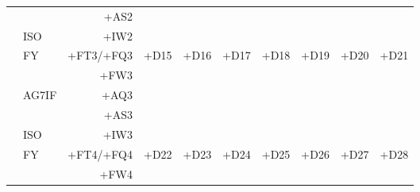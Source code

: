 \begin{center}
{\begin{tabular}{|c|lr|c|c|c|c|c|c|c|}
                        &       &      +AS2 &                            &                            &                            &                            &                            &                            &                            \\
                        & ISO   &      +IW2 &                            &                            &                            &                            &                            &                            &                            \\
\hline
    \multirow{5}{0.5in}{} & FY    & +FT3/+FQ3 & \multirow[t]{5}{1in}{+D15} & \multirow[t]{5}{1in}{+D16} & \multirow[t]{5}{1in}{+D17} & \multirow[t]{5}{1in}{+D18} & \multirow[t]{5}{1in}{+D19} & \multirow[t]{5}{1in}{+D20} & \multirow[t]{5}{1in}{+D21} \\
                        &       &      +FW3 &                            &                            &                            &                            &                            &                            &                            \\
                        & AG7IF &      +AQ3 &                            &                            &                            &                            &                            &                            &                            \\
                        &       &      +AS3 &                            &                            &                            &                            &                            &                            &                            \\
                        & ISO   &      +IW3 &                            &                            &                            &                            &                            &                            &                            \\
\hline
    \multirow{5}{0.5in}{} & FY    & +FT4/+FQ4 & \multirow[t]{5}{1in}{+D22} & \multirow[t]{5}{1in}{+D23} & \multirow[t]{5}{1in}{+D24} & \multirow[t]{5}{1in}{+D25} & \multirow[t]{5}{1in}{+D26} & \multirow[t]{5}{1in}{+D27} & \multirow[t]{5}{1in}{+D28} \\
                        &       &      +FW4 &                            &                            &                            &                            &                            &                            &                            \\

\end{tabular}}
\end{center}
